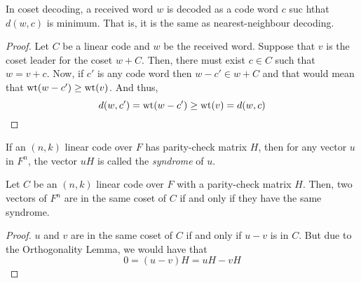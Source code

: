 \begin{proposition}
	In coset decoding, a received word $w$ is decoded as a code word $c$ suc hthat $d(w,c)$ is minimum. That is, it is the same as nearest-neighbour decoding.
\end{proposition}
\begin{proof}
	Let $C$ be a linear code and $w$ be the received word. Suppose that $v$ is the coset leader for the coset $w+C$. Then, there must exist $c\in C$ such that $w = v + c$. Now, if $c'$ is any code word then $w-c'\in w+C$ and that would mean that $\operatorname{wt}(w-c')\ge \operatorname{wt}(v)$. And thus,
	\begin{equation*}
		d(w,c') = \operatorname{wt}(w-c') \ge \operatorname{wt}(v) = d(w,c)
	\end{equation*}
\end{proof}

\begin{definition}
	If an $(n,k)$ linear code over $F$ has parity-check matrix $H$, then for any vector $u$ in $F^n$, the vector $uH$ is called the \textit{syndrome} of $u$.
\end{definition}

\begin{proposition}
	Let $C$ be an $(n,k)$ linear code over $F$ with a parity-check matrix $H$. Then, two vectors of $F^n$ are in the same coset of $C$ if and only if they have the same syndrome.
\end{proposition}
\begin{proof}
	$u$ and $v$ are in the same coset of $C$ if and only if $u-v$ is in $C$. But due to the Orthogonality Lemma, we would have that 
	$$
	0 = (u-v)H = uH - vH
	$$
\end{proof}